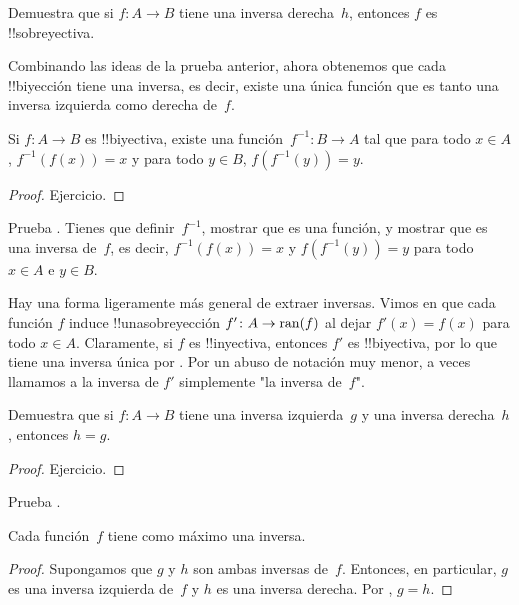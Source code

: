 \documentclass[../../../include/open-logic-section]{subfiles}
\begin{document}
\begin{prob}
Demuestra que si $f\colon A \to B$ tiene una inversa derecha~$h$, entonces $f$ es !!{sobreyectiva}.
\end{prob}

\begin{explain}
Combinando las ideas de la prueba anterior, ahora obtenemos que cada !!{biyección} tiene una inversa, es decir, existe una única función que es tanto una inversa izquierda como derecha de~$f$.
\end{explain}

\begin{prop}
Si $f\colon A \to B$ es !!{biyectiva}, existe una función~$f^{-1}\colon B \to A$ tal que para todo $x \in A$, $f^{-1}(f(x)) = x$ y para todo $y \in B$, $f(f^{-1}(y)) = y$.
\end{prop}

\begin{proof}
Ejercicio.
\end{proof}

\begin{prob}
Prueba . Tienes que definir~$f^{-1}$, mostrar que es una función, y mostrar que es una inversa de~$f$, es decir, $f^{-1}(f(x)) = x$ y $f(f^{-1}(y)) = y$ para todo $x \in A$ e $y \in B$.
\end{prob}

\begin{explain}
Hay una forma ligeramente más general de extraer inversas. Vimos en  que cada función $f$ induce !!una{sobreyección} $f' \colon A \to \mathrm{ran}(f)$ al dejar $f'(x) = f(x)$ para todo $x \in A$. Claramente, si $f$ es !!{inyectiva}, entonces $f'$ es !!{biyectiva}, por lo que tiene una inversa única por . Por un abuso de notación muy menor, a veces llamamos a la inversa de $f'$ simplemente "la inversa de~$f$".
\end{explain}

\begin{prop}
Demuestra que si $f\colon A \to B$ tiene una inversa izquierda~$g$ y una inversa derecha~$h$, entonces $h = g$.
\end{prop}

\begin{proof}
Ejercicio.
\end{proof}

\begin{prob}
Prueba .
\end{prob}

\begin{prop}
Cada función~$f$ tiene como máximo una inversa.
\end{prop}

\begin{proof}
Supongamos que $g$ y $h$ son ambas inversas de~$f$. Entonces, en particular, $g$ es una inversa izquierda de~$f$ y $h$ es una inversa derecha. Por , $g = h$.
\end{proof}
\end{document}
